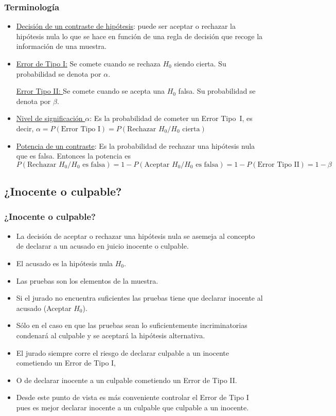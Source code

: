 \begin{frame}
\frametitle{Terminología}
\begin{itemize}
\item \underline{Decisión de un contraste de hipótesis}: puede ser aceptar o rechazar la
hipótesis nula lo que se hace en función de una regla de decisión que recoge la
información de una muestra.
\item \underline{Error de Tipo I:} Se comete cuando se rechaza $H_{0}$ siendo cierta. Su
probabilidad se denota por $\alpha$.

\underline{Error Tipo II: }Se comete cuando se acepta una $H_{0}$ falsa. Su probabilidad
se denota por $\beta$.

\item \underline{Nivel de significación $\alpha$}: Es la probabilidad de cometer un
 Error Tipo~I, es decir, 
  $\alpha=P(\mbox{Error Tipo I})=P(\mbox{Rechazar } H_{0}/H_{0}
\mbox{ cierta})$

\item \underline{Potencia de un contraste}: Es la probabilidad de rechazar una hipótesis nula que
es falsa. Entonces la potencia es 
$P(\mbox{Rechazar } H_{0}/ H_{0}\mbox{ es falsa})=
1-P(\mbox{Aceptar } H_{0}/ H_{0}\mbox{ es falsa})= 1-P(\mbox{Error Tipo II})=1-\beta$
\end{itemize}
\end{frame}

\subsection{¿Inocente o culpable?}


\begin{frame}
\frametitle{¿Inocente o culpable?}
\begin{itemize}
\item La decisión de aceptar o rechazar una hipótesis nula se asemeja al concepto de declarar a un acusado en juicio inocente o culpable.
\item  El acusado es la hipótesis nula $H_{0}$.
\item  Las pruebas son los elementos de la muestra.
\item  Si el jurado no encuentra suficientes las
   pruebas tiene que declarar inocente al acusado (Aceptar $H_{0}$).
\item Sólo en el caso en que las pruebas sean lo suficientemente
   incriminatorias condenará al culpable y se aceptará la hipótesis
   alternativa.
\item  El jurado siempre corre el riesgo de declarar culpable a un
   inocente cometiendo un Error de Tipo I,
\item O de  declarar inocente a un culpable cometiendo un Error de Tipo II.
\item  Desde este punto de vista es más conveniente controlar el Error de
   Tipo I pues es mejor declarar inocente a un culpable que culpable
   a un inocente.
\end{itemize}
\end{frame}

